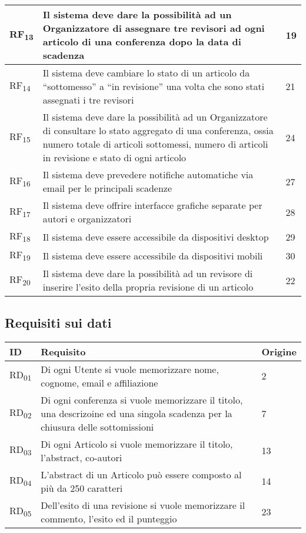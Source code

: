 \begin{tabular}{|p{1cm}|p{9cm}|p{1cm}|}
  \hline
  RF\textsubscript{13} & Il sistema deve dare la possibilità ad un Organizzatore di assegnare tre revisori ad ogni articolo di una conferenza dopo la data di scadenza & 19 \\
  \hline
  RF\textsubscript{14} & Il sistema deve cambiare lo stato di un articolo da ``sottomesso'' a ``in revisione'' una volta che sono stati assegnati i tre revisori & 21\\
  \hline
  RF\textsubscript{15} & Il sistema deve dare la possibilità ad un Organizzatore di consultare lo stato aggregato di una conferenza, ossia numero totale di articoli sottomessi, numero di articoli in revisione e stato di ogni articolo & 24 \\
  \hline
  RF\textsubscript{16} & Il sistema deve prevedere notifiche automatiche via email per le principali scadenze & 27 \\
  \hline
  RF\textsubscript{17} & Il sistema deve offrire interfacce grafiche separate per autori e organizzatori & 28\\
  \hline
  RF\textsubscript{18} & Il sistema deve essere accessibile da dispositivi desktop & 29\\
  \hline
  RF\textsubscript{19} & Il sistema deve essere accessibile da dispositivi mobili & 30\\
  \hline
  RF\textsubscript{20} & Il sistema deve dare la possibilità ad un revisore di inserire l'esito della propria revisione di un articolo & 22\\
  \hline
\end{tabular}
\subsection{Requisiti sui dati}
\label{sec:requisiti_dati}
\begin{tabular}{|p{1cm}|p{9cm}|p{1cm}|}
  \hline
  \rowcolor{SkyBlue}
  ID & Requisito & Origine \\
  \hline
  \hline
  RD\textsubscript{01} & Di ogni Utente si vuole memorizzare nome, cognome, email e affiliazione & 2 \\
  \hline
  RD\textsubscript{02} & Di ogni conferenza si vuole memorizzare il titolo, una descrizoine ed una singola scadenza per la chiusura delle sottomissioni & 7\\
  \hline
  RD\textsubscript{03} & Di ogni Articolo si vuole memorizzare il titolo, l'abstract, co-autori & 13 \\
  \hline
  RD\textsubscript{04} & L'abstract di un Articolo può essere composto al più da 250 caratteri & 14 \\
  \hline
   RD\textsubscript{05} & Dell'esito di una revisione si vuole memorizzare il commento, l'esito ed il punteggio & 23 \\
  \hline
\end{tabular}

